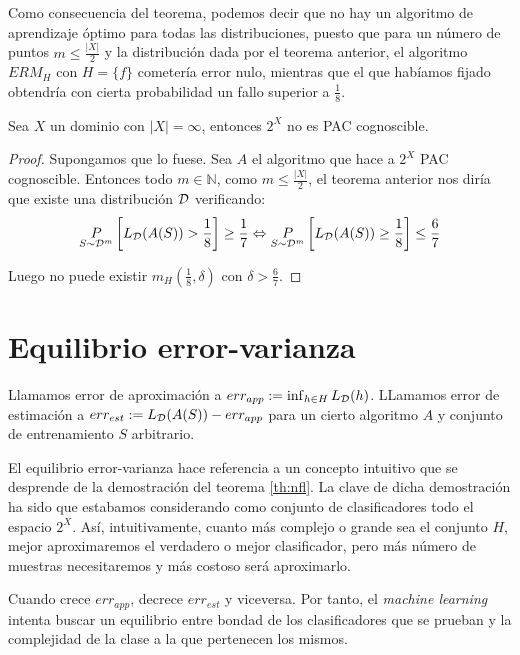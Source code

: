 Como consecuencia del teorema, podemos decir que no hay un algoritmo de aprendizaje óptimo para todas las 
distribuciones, puesto que para un número de puntos $m \le \frac{|X|}{2}$ y la distribución dada por el teorema
anterior, el algoritmo $ERM_H$ con $H = \{f\}$ cometería error nulo, mientras que el que habíamos fijado
obtendría con cierta probabilidad un fallo superior a $\frac{1}{8}$.

\begin{corollary}
 Sea $X$ un dominio con $|X| = \infty$, entonces $2^X$ no es PAC cognoscible.
\end{corollary}

\begin{proof}
 Supongamos que lo fuese. Sea $A$ el algoritmo que hace a $2^X$ PAC cognoscible. Entonces todo $m\in \mathbb{N}$, como 
 $m\le \frac{|X|}{2}$, el teorema anterior nos diría que existe una distribución $\mathcal{D}$ verificando: 
 \[
   \underset{S\sim \mathcal{D}^m}{P} \left[ L_{\mathcal{D}}(A(S)) > \frac{1}{8} \right] \ge \frac{1}{7} \Leftrightarrow 
   \underset{S\sim \mathcal{D}^m}{P} \left[ L_{\mathcal{D}}(A(S)) \ge \frac{1}{8} \right] \le \frac{6}{7} 
 \]
 
 Luego no puede existir $m_H \left(\frac{1}{8}, \delta\right)$ con $\delta > \frac{6}{7}$.
\end{proof}


\section{Equilibrio error-varianza}
\begin{definition}
 Llamamos error de aproximación a $err_{app} := \inf_{h\in H} L_{\mathcal{D}}(h)$. LLamamos error de estimación a $err_{est} := 
 L_{\mathcal{D}} (A(S)) - err_{app}$ para un cierto algoritmo $A$ y conjunto de entrenamiento $S$ arbitrario.
\end{definition}

El equilibrio error-varianza hace referencia a un concepto intuitivo que se desprende de la demostración del teorema
\ref{th:nfl}. La clave de dicha demostración ha sido que estabamos considerando
como conjunto de clasificadores todo el espacio $2^X$. Así, intuitivamente, cuanto más complejo o grande sea el conjunto 
$H$, mejor aproximaremos el verdadero o mejor clasificador, pero más número de muestras necesitaremos y más costoso será
aproximarlo.

Cuando crece $err_{app}$, decrece $err_{est}$ y viceversa. Por tanto, el \emph{machine learning} intenta buscar un equilibrio
entre bondad de los clasificadores que se prueban y la complejidad de la clase a la que pertenecen los mismos.
